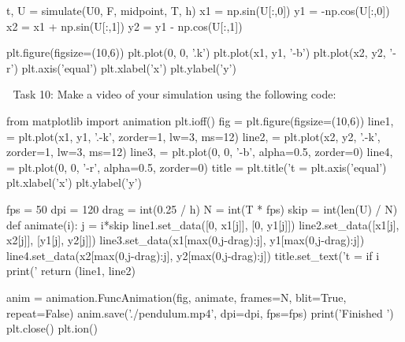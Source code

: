 \documentclass[main.tex]{subfiles}
\begin{document}
\begin{python}
t, U = simulate(U0, F, midpoint, T, h)
x1 = np.sin(U[:,0])
y1 = -np.cos(U[:,0])
x2 = x1 + np.sin(U[:,1])
y2 = y1 - np.cos(U[:,1])

plt.figure(figsize=(10,6))
plt.plot(0, 0, '.k')
plt.plot(x1, y1, '-b')
plt.plot(x2, y2, '-r')
plt.axis('equal')
plt.xlabel('x')
plt.ylabel('y')
\end{python}
Task 10: Make a video of your simulation using the following code:

\begin{python}
from matplotlib import animation
plt.ioff()
fig = plt.figure(figsize=(10,6))
line1, = plt.plot(x1, y1, '.-k', zorder=1, lw=3, ms=12)
line2, = plt.plot(x2, y2, '.-k', zorder=1, lw=3, ms=12)
line3, = plt.plot(0, 0, '-b', alpha=0.5, zorder=0)
line4, = plt.plot(0, 0, '-r', alpha=0.5, zorder=0)
title = plt.title('t = %
plt.axis('equal')
plt.xlabel('x')
plt.ylabel('y')

fps = 50
dpi = 120
drag = int(0.25 / h)
N = int(T * fps)
skip = int(len(U) / N)
def animate(i):
    j = i*skip
    line1.set_data([0, x1[j]], [0, y1[j]])
    line2.set_data([x1[j], x2[j]], [y1[j], y2[j]])
    line3.set_data(x1[max(0,j-drag):j], y1[max(0,j-drag):j])
    line4.set_data(x2[max(0,j-drag):j], y2[max(0,j-drag):j])
    title.set_text('t = %
    if i %
        print('%
    return (line1, line2)

anim = animation.FuncAnimation(fig, animate, frames=N,
                               blit=True, repeat=False)
anim.save('./pendulum.mp4', dpi=dpi, fps=fps)
print('Finished    ')
plt.close()
plt.ion()
\end{python}
\end{document}
